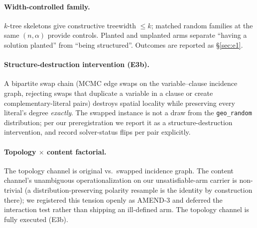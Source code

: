 \documentclass[manuscript, screen, review]{jair}
\begin{document}
\paragraph{Width-controlled family.}
$k$-tree skeletons give constructive treewidth $\le k$; matched random
families at the same $(n,\alpha)$ provide controls. Planted and unplanted arms
separate ``having a solution planted'' from ``being structured''. Outcomes are
reported as \S\ref{sec:e1}.

\paragraph{Structure-destruction intervention (E3b).}
A bipartite swap chain (MCMC edge swaps on the variable--clause incidence
graph, rejecting swaps that duplicate a variable in a clause or create
complementary-literal pairs) destroys spatial locality while preserving every
literal's degree \emph{exactly}. The swapped instance is not a draw from the
\texttt{geo\_random} distribution; per our preregistration we report it as a
structure-destruction intervention, and record solver-status flips per pair
explicitly.

\paragraph{Topology $\times$ content factorial.}
The topology channel is original vs.\ swapped incidence graph. The content
channel's unambiguous operationalization on our unsatisfiable-arm carrier is
non-trivial (a distribution-preserving polarity resample is the identity by
construction there); we registered this tension openly as AMEND-3 and deferred
the interaction test rather than shipping an ill-defined arm. The topology
channel is fully executed (E3b).
\end{document}
